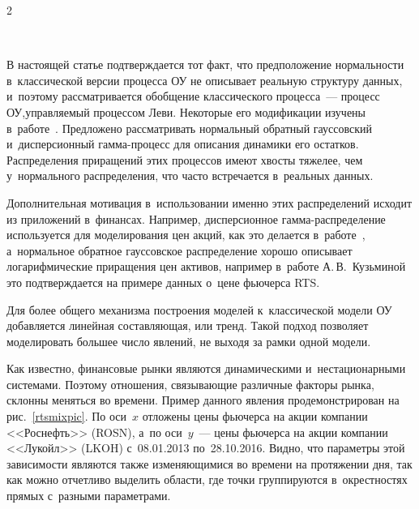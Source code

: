 \begin{multicols}{2}
        \begin{figure*} %
        \vspace*{1pt}
\begin{center}
\mbox{%
\epsfxsize=109.749mm
}
\end{center}
\vspace*{-9pt}
                \label{rtsmixpic}
        \end{figure*}


В настоящей статье подтверждается тот факт, что предположение нормальности 
в~классической версии процесса ОУ не описывает реальную структуру 
данных, и~поэтому рассматривается обоб\-щение классического процесса~--- процесс 
ОУ,\linebreak управ\-ля\-емый процессом Леви. Некоторые его модификации 
изучены в~работе~\cite{GarOlk2000}. Предложено рас\-смат\-ри\-вать нормальный обратный 
гауссовский и~дис\-пер\-сионный гам\-ма-про\-цесс для описания динамики его остатков. 
Распределения прираще\-ний этих процессов имеют хвосты тяжелее, чем у~нормального 
распределения, что часто встречается в~реальных данных. 

Дополнительная мотивация 
в~использовании именно этих распределений исходит из приложений в~финансах. 
Например, дисперсионное гам\-ма-рас\-пре\-де\-ле\-ние используется для моделирования цен 
акций, как это делается в~работе~\cite{Fin2009}, а~нормальное обратное 
гауссовское распределение хорошо описывает логарифмические приращения цен 
активов, например в~работе А.\,В.~Кузьминой~\cite{Kuzmina2011} это подтверждается 
на примере данных о~цене фьючерса RTS.

Для более общего механизма построения моделей к~классической модели ОУ 
добавляется линейная составляющая, или тренд. Такой подход позволяет 
моделировать большее число явлений, не выходя за рамки одной модели.

Как известно, финансовые рынки являются динамическими и~нестационарными 
системами. Поэтому отношения, связывающие различные факторы рынка, склонны 
меняться во времени. Пример данного явления продемонстрирован на рис.~\ref{rtsmixpic}. 
По оси~$x$ отложены цены фьючерса на акции компании 
<<Роснефть>> (ROSN), а~по оси~$y$~--- цены фьючерса на акции компании <<Лукойл>> 
(LKOH) с~08.01.2013 по~28.10.2016. Видно, что параметры этой зависимости 
являются также изменяющимися во времени на протяжении дня, так как можно 
отчетливо выделить области, где точки группируются в~окрестностях прямых 
с~разными параметрами.


\end{multicols}
